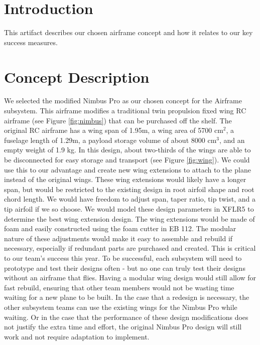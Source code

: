 \documentclass[]{auvsi_doc}
\begin{document}
\begin{AUVSITitlePage}
\begin{artifacttable}
\end{artifacttable}
\end{AUVSITitlePage}

\section{Introduction}

This artifact describes our chosen airframe concept and how it relates to our key success measures.

\section{Concept Description}

We selected the modified Nimbus Pro as our chosen concept for the Airframe subsystem. This airframe modifies a traditional twin propulsion fixed wing RC airframe (see Figure \ref{fig:nimbus}) that can be purchased off the shelf. The original RC airframe has a wing span of 1.95m, a wing area of 5700 cm$^2$, a fuselage length of 1.29m, a payload storage volume of about 8000 cm$^3$, and an empty weight of 1.9 kg. In this design, about two-thirds of the wings are able to be disconnected for easy storage and transport (see Figure \ref{fig:wing}). We could use this to our advantage and create new wing extensions to attach to the plane instead of the original wings. These wing extensions would likely have a longer span, but would be restricted to the existing design in root airfoil shape and root chord length. We would have freedom to adjust span, taper ratio, tip twist, and a tip airfoil if we so choose. We would model these design parameters in XFLR5 to determine the best wing extension design. The wing extensions would be made of foam and easily constructed using the foam cutter in EB 112. The modular nature of these adjustments would make it easy to assemble and rebuild if necessary, especially if redundant parts are purchased and created. This is critical to our team's success this year. To be successful, each subsystem will need to prototype and test their designs often - but no one can truly test their designs without an airframe that flies. Having a modular wing design would still allow for fast rebuild, ensuring that other team members would not be wasting time waiting for a new plane to be built. In the case that a redesign is necessary, the other subsystem teams can use the existing wings for the Nimbus Pro while waiting. Or in the case that the performance of these design modifications does not justify the extra time and effort, the original Nimbus Pro design will still work and not require adaptation to implement.
\end{document}
